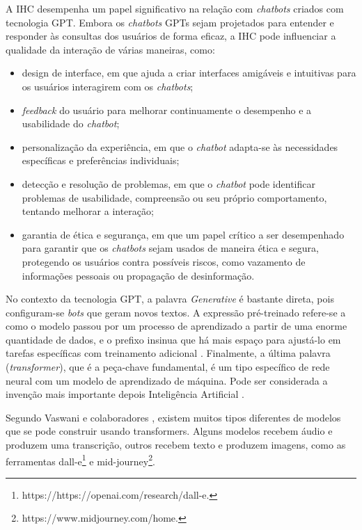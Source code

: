 \documentclass[10pt, conference, compsocconf]{IEEEtran}
\begin{document}
A IHC desempenha um papel significativo na relação com \textit{chatbots} criados com tecnologia GPT. Embora os \textit{chatbots} GPTs sejam projetados para entender e responder às consultas dos usuários de forma eficaz, a IHC pode influenciar a qualidade da interação de várias maneiras, como:
\begin{itemize}
    \item design de interface, em que ajuda a criar interfaces amigáveis e intuitivas para os usuários interagirem com os \textit{chatbots};
    \item \textit{feedback} do usuário para melhorar continuamente o desempenho e a usabilidade do \textit{chatbot};
    \item personalização da experiência, em que o \textit{chatbot} adapta-se às necessidades específicas e preferências individuais;
    \item detecção e resolução de problemas, em que o \textit{chatbot} pode identificar problemas de usabilidade, compreensão ou seu próprio comportamento, tentando melhorar a interação;
    \item garantia de ética e segurança, em que um papel crítico a ser desempenhado para garantir  que os \textit{chatbots} sejam usados de maneira ética e segura, protegendo os usuários contra possíveis riscos, como vazamento de informações pessoais ou propagação de desinformação.
\end{itemize}
No contexto da tecnologia GPT, a palavra \textit{Generative}  é bastante direta, pois configuram-se \textit{bots} que geram novos textos. A expressão pré-treinado refere-se a como o modelo passou por um processo de aprendizado a partir de uma enorme quantidade de dados, e o prefixo insinua que há mais espaço para ajustá-lo em tarefas específicas com treinamento adicional \cite{devlin2018bert}. Finalmente, a última palavra (\textit{transformer}), que é a peça-chave fundamental, é um tipo específico de rede neural com um modelo de aprendizado de máquina. Pode ser considerada a invenção mais importante depois Inteligência Artificial \cite{Attention-Is-All-You-Need}.

Segundo Vaswani e colaboradores \cite{Attention-Is-All-You-Need}, existem muitos tipos diferentes de modelos que se pode construir usando transformers. Alguns modelos recebem áudio e produzem uma transcrição, outros recebem texto e produzem imagens, como as ferramentas dall-e\footnote{https://https://openai.com/research/dall-e.} e mid-journey\footnote{https://www.midjourney.com/home.}.
\end{document}

